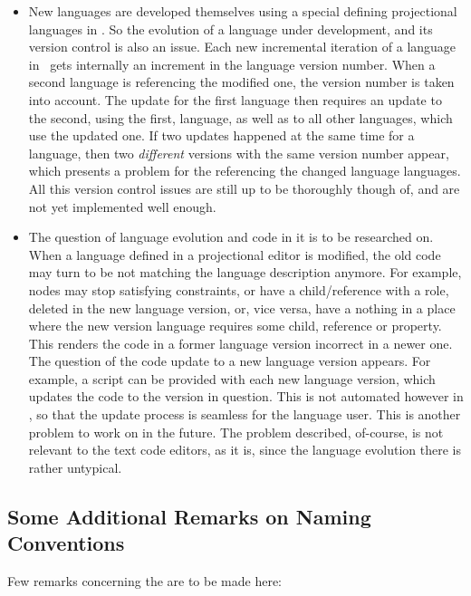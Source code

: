 \begin{itemize}
  \item  New languages are developed themselves using a special defining projectional languages in \jbmps. So the evolution of a language under development,
  and its version control is also an issue. Each new incremental iteration of a language in \jbmps\ gets internally an increment in the language
  version number. When a second language is referencing the modified one, the version number is taken into account. The update for the first language
  then requires an update to the second, using the first,  language, as well as to all other languages, which use the updated one. If two updates happened
  at the same time for a language, then two \emph{different} versions with the same version number appear, which presents a problem for the 
  referencing the changed language languages. All this version control issues are still up to be thoroughly though of, and are not yet 
  implemented well enough.

  \item  The question of language evolution and code in it is to be researched on.  When a language defined in a projectional editor is
  modified, the old code may turn to be not matching the language description anymore. For example, nodes may stop satisfying constraints,
  or have a child/reference with a role, deleted in the new language version, or, vice versa, have a nothing in a place where the new
  version language requires some child, reference or property. This renders the code in a former language version incorrect in a newer one.
  The question of the code update to a new language version appears. For example, a script can be provided with each new language version,
  which updates the code to the version in question. This is not automated however in \jbmps, so that the update process is seamless for the 
  language user. This is another problem to work on in the future. The problem described, of-course, is not relevant to the text code editors,
  as it is, since the language evolution there is rather untypical.
  
  
 \end{itemize}
  
  
  \subsection{Some Additional Remarks on Naming Conventions}
  \label{remarksonnamingconventions}
  Few remarks concerning the   are to be made here:
  
